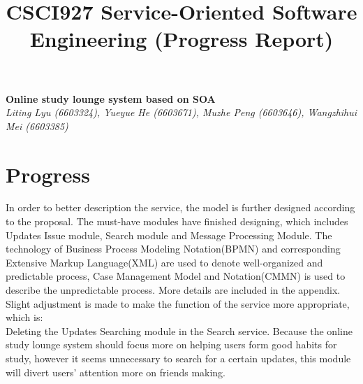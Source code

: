 \documentclass[runningheads]{llncs}
\begin{document}
\title{\large{CSCI927 Service-Oriented Software Engineering (Progress Report)}}
\author{}
\institute{}
\maketitle
\vspace{-1cm}



\begin{center}
\Large{\textbf{Online study lounge system based on SOA}} \\ %
\vspace{0.2cm}
\large{\emph{ Liting Lyu (6603324), Yueyue  He (6603671), Muzhe Peng (6603646), Wangzhihui Mei (6603385)}}\\%
\vspace{0.3cm}
\end{center}

\noindent %
\section{Progress}
In order to better description the service, the model is further designed according to the proposal. The must-have modules have finished designing, which includes Updates Issue module, Search module and Message Processing Module. The technology of Business Process Modeling Notation(BPMN) and corresponding Extensive Markup Language(XML) are used to denote well-organized and predictable process, Case Management Model and Notation(CMMN) is used to describe the unpredictable process. More details are included in the appendix. 
\\Slight adjustment is made to make the function of the service more appropriate, which is:
\\Deleting the Updates Searching module in the Search service. Because the online study lounge system should focus more on helping users form good habits for study, however it seems unnecessary to search for a certain updates, this module will divert users’ attention more on friends making. 
\end{document}
